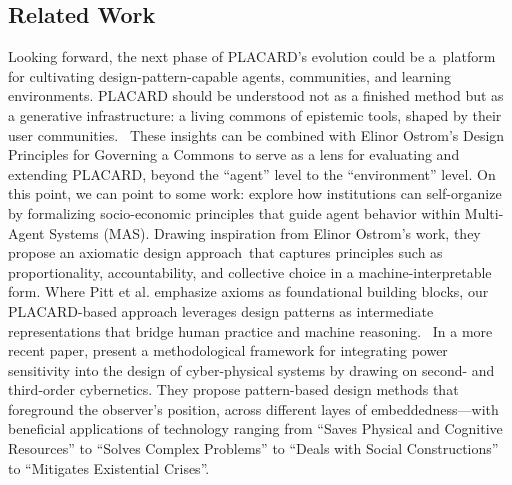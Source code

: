 \documentclass[acmlarge,timestamp]{acmart}
\begin{document}

\subsection{Related Work}
Looking forward, the next phase of PLACARD's evolution could be
a~platform for cultivating design-pattern-capable agents, communities,
and learning environments. PLACARD should be understood not as a
finished method but as a generative infrastructure: a living commons
of epistemic tools, shaped by their user communities. ~These insights
can be combined with Elinor Ostrom's Design Principles for Governing a
Commons to serve as a lens for evaluating and extending PLACARD,
beyond the ``agent'' level to the ``environment'' level. On this
point, we can point to some work: \citet{10.1145/2382570.2382575}
explore how institutions can self-organize by formalizing
socio-economic principles that guide agent behavior within Multi-Agent
Systems (MAS).  Drawing inspiration from Elinor Ostrom's work, they
propose an axiomatic design approach~that captures principles such as
proportionality, accountability, and collective choice in a
machine-interpretable form. Where Pitt et al. emphasize axioms as
foundational building blocks, our PLACARD-based approach leverages
design patterns as intermediate representations that bridge human
practice and machine reasoning. ~In a more recent paper,
\citet{10.1162/isal_a_00800} present a methodological framework for
integrating power sensitivity into the design of cyber-physical
systems by drawing on second- and third-order cybernetics. They
propose pattern-based design methods that foreground the observer's
position, across different layes of embeddedness---with beneficial
applications of technology ranging from ``Saves Physical and Cognitive
Resources'' to ``Solves Complex Problems'' to ``Deals with Social
Constructions'' to ``Mitigates Existential Crises''.
\end{document}
